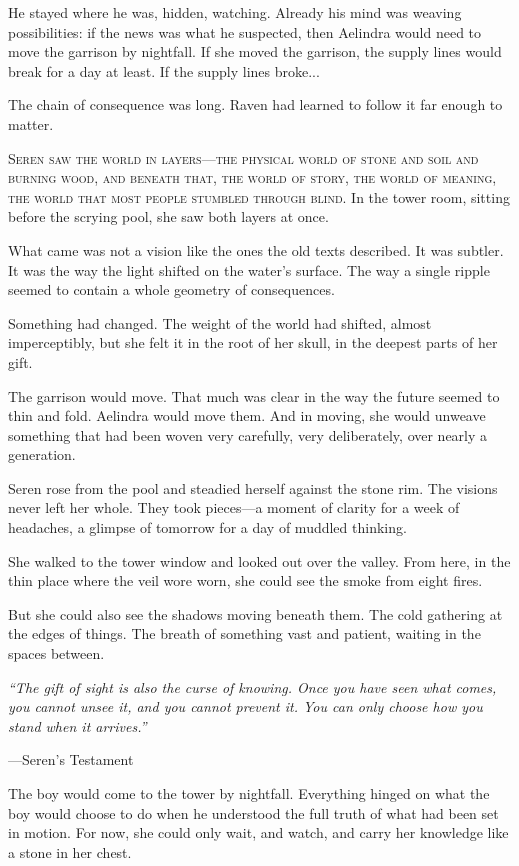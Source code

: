 \documentclass[openany,11pt]{book}
\begin{document}
He stayed where he was, hidden, watching. Already his mind was weaving possibilities: if the news was what he suspected, then Aelindra would need to move the garrison by nightfall. If she moved the garrison, the supply lines would break for a day at least. If the supply lines broke...

The chain of consequence was long. Raven had learned to follow it far enough to matter.

\newpage




\lettrine[lines=3]{S}{eren saw the world in layers—the physical world of stone and soil and burning wood, and beneath that, the world of story, the world of meaning, the world that most people stumbled through blind.} In the tower room, sitting before the scrying pool, she saw both layers at once.

What came was not a vision like the ones the old texts described. It was subtler. It was the way the light shifted on the water's surface. The way a single ripple seemed to contain a whole geometry of consequences.

Something had changed. The weight of the world had shifted, almost imperceptibly, but she felt it in the root of her skull, in the deepest parts of her gift.

The garrison would move. That much was clear in the way the future seemed to thin and fold. Aelindra would move them. And in moving, she would unweave something that had been woven very carefully, very deliberately, over nearly a generation.

\scenebreak

Seren rose from the pool and steadied herself against the stone rim. The visions never left her whole. They took pieces—a moment of clarity for a week of headaches, a glimpse of tomorrow for a day of muddled thinking.

She walked to the tower window and looked out over the valley. From here, in the thin place where the veil wore worn, she could see the smoke from eight fires.

But she could also see the shadows moving beneath them. The cold gathering at the edges of things. The breath of something vast and patient, waiting in the spaces between.

\begin{quotebox}
  \textit{``The gift of sight is also the curse of knowing. Once you have seen what comes, you cannot unsee it, and you cannot prevent it. You can only choose how you stand when it arrives.''}
  
  \hfill—Seren's Testament
\end{quotebox}

The boy would come to the tower by nightfall. Everything hinged on what the boy would choose to do when he understood the full truth of what had been set in motion. For now, she could only wait, and watch, and carry her knowledge like a stone in her chest.
\end{document}
